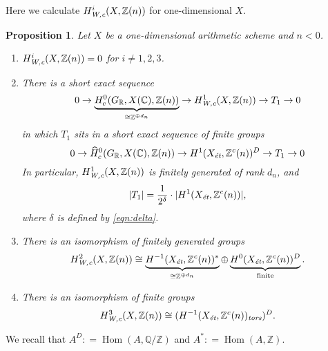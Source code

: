 \documentclass[draft]{article}
\DeclareMathOperator{\Hom}{Hom}
\newcommand{\CC}{\mathbb{C}}
\newcommand{\QQ}{\mathbb{Q}}
\newcommand{\RR}{\mathbb{R}}
\newcommand{\ZZ}{\mathbb{Z}}
\newcommand{\et}{\text{\it \'{e}t}}
\newcommand{\tors}{\text{\it tors}}
\newcommand{\Wc}{\text{\it W,c}}
\newcommand{\dfn}{\mathrel{\mathop:}=}
\theoremstyle{myplain}
\newtheorem{proposition}[theorem]{Proposition}
\theoremstyle{mydefinition}
\begin{document}
Here we calculate $H^i_\Wc (X, \ZZ(n))$ for one-dimensional $X$.

\begin{proposition}
  \label{prop:calculation-of-H-Wc}
  Let $X$ be a one-dimensional arithmetic scheme and $n < 0$.

  \begin{enumerate}
  \item[0)] $H^i_\Wc (X, \ZZ(n)) = 0$ for $i \ne 1,2,3$.

  \item[1)] There is a short exact sequence
    \begin{equation}
      \label{eqn:H1Wc-ses}
      0 \to \underbrace{H^0_c (G_\RR, X(\CC), \ZZ(n))}_{\cong \ZZ^{\oplus d_n}} \to
      H^1_\Wc (X, \ZZ(n)) \to T_1 \to 0
    \end{equation}
    in which $T_1$ sits in a short exact sequence of finite groups
    \[ 0 \to \widehat{H}^0_c (G_\RR, X(\CC), \ZZ(n)) \to
      H^1 (X_\et, \ZZ^c(n))^D \to
      T_1 \to 0 \]
    In particular, $H^1_\Wc (X, \ZZ(n))$ is finitely generated of rank $d_n$,
    and
    $$|T_1| = \frac{1}{2^\delta}\cdot |H^1 (X_\et, \ZZ^c (n))|,$$
    where $\delta$ is defined by \eqref{eqn:delta}.

  \item[2)] There is an isomorphism of finitely generated groups
    \[ H^2_\Wc (X, \ZZ(n)) \cong
      \underbrace{H^{-1} (X_\et, \ZZ^c(n))^*}_{\cong \ZZ^{\oplus d_n}}
      \oplus
      \underbrace{H^0 (X_\et, \ZZ^c(n))^D}_{\text{finite}}. \]

  \item[3)] There is an isomorphism of finite groups
    $$H^3_\Wc (X, \ZZ(n)) \cong (H^{-1} (X_\et, \ZZ^c(n))_\tors)^D.$$
  \end{enumerate}
\end{proposition}

We recall that $A^D \dfn \Hom (A, \QQ/\ZZ)$ and $A^* \dfn \Hom (A, \ZZ)$.
\end{document}
